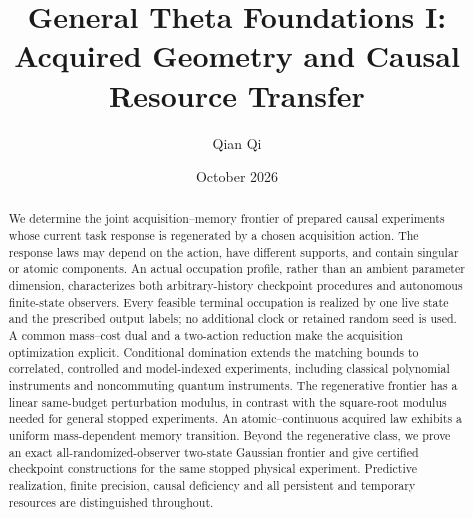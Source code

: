 \documentclass[11pt,reqno]{amsart}
\title[Acquired geometry and causal resource transfer]{General Theta Foundations I:\\Acquired Geometry and Causal Resource Transfer}
\author{Qian Qi}
\date{October 2026}
\numberwithin{equation}{section}
\theoremstyle{definition}
\theoremstyle{remark}
\begin{document}
\begin{abstract}
We determine the joint acquisition--memory frontier of prepared causal experiments whose current task response is regenerated by a chosen acquisition action. The response laws may depend on the action, have different supports, and contain singular or atomic components. An actual occupation profile, rather than an ambient parameter dimension, characterizes both arbitrary-history checkpoint procedures and autonomous finite-state observers. Every feasible terminal occupation is realized by one live state and the prescribed output labels; no additional clock or retained random seed is used. A common mass--cost dual and a two-action reduction make the acquisition optimization explicit. Conditional domination extends the matching bounds to correlated, controlled and model-indexed experiments, including classical polynomial instruments and noncommuting quantum instruments. The regenerative frontier has a linear same-budget perturbation modulus, in contrast with the square-root modulus needed for general stopped experiments. An atomic--continuous acquired law exhibits a uniform mass-dependent memory transition. Beyond the regenerative class, we prove an exact all-randomized-observer two-state Gaussian frontier and give certified checkpoint constructions for the same stopped physical experiment. Predictive realization, finite precision, causal deficiency and all persistent and temporary resources are distinguished throughout.
\end{abstract}
\maketitle








\appendix




\end{document}
